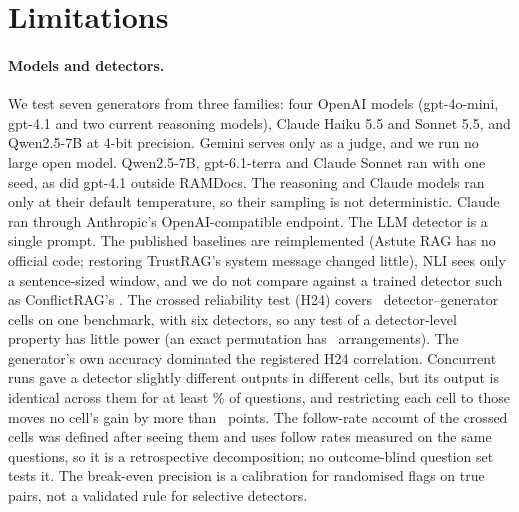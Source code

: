\section*{Limitations}

\paragraph{Models and detectors.} We test seven generators from three families: four OpenAI models (gpt-4o-mini,
gpt-4.1 and two current reasoning models), Claude Haiku 5.5 and Sonnet 5.5, and Qwen2.5-7B at 4-bit precision. Gemini
serves only as a judge, and we run no large open model. Qwen2.5-7B, gpt-6.1-terra and Claude Sonnet ran with one seed,
as did gpt-4.1 outside RAMDocs. The reasoning and Claude models ran only at their default temperature, so their
sampling is not deterministic. Claude ran through Anthropic's OpenAI-compatible endpoint. The LLM detector is a single
prompt. The published baselines are reimplemented (Astute RAG has no official code; restoring TrustRAG's system message
changed little), NLI sees only a sentence-sized window, and we do not compare against a trained detector such as
ConflictRAG's \citep{wang2026conflictrag}. The crossed reliability test (H24) covers \hTwentyFourCells\
detector--generator cells on one benchmark, with six detectors, so any test of a detector-level property has little
power (an exact permutation has \hRedoNPerm\ arrangements). The generator's own accuracy dominated the
registered H24 correlation. Concurrent runs gave a detector slightly different outputs in different cells, but its output is
identical across them for at least \frozenShareMin\% of questions, and restricting each cell to those moves no
cell's gain by more than \frozenMaxShift\ points. The follow-rate account of the crossed cells was defined after seeing
them and uses follow rates measured on the same questions, so it is a retrospective decomposition; no outcome-blind
question set tests it. The break-even precision is a calibration for randomised flags on true pairs, not a validated
rule for selective detectors.

